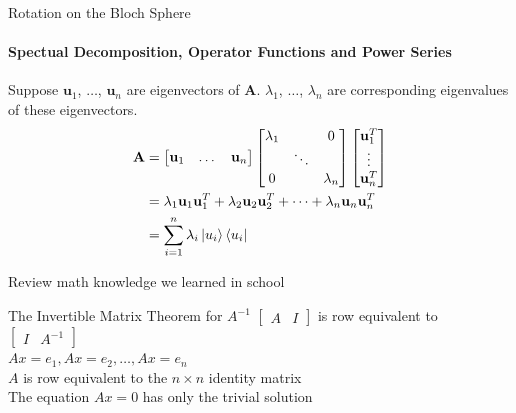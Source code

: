 \documentclass{beamer}
\begin{document}
\begin{frame}{Rotation on the Bloch Sphere}
  \framesubtitle{Spectual Decomposition, Operator Functions and Power Series}
  {\tiny
    Suppose $\mathbf{u}_1$, $\dots$, $\mathbf{u}_n$ are eigenvectors of $\mathbf{A}$.
    $\lambda_1$, $\dots$, $\lambda_n$ are corresponding eigenvalues of these eigenvectors.
    \begin{align*}
      \mathbf{A} &= \begin{bmatrix}
                      \mathbf{u}_1 & \dots & \mathbf{u}_n
                    \end{bmatrix}
                    \begin{bmatrix}
                      \lambda_1 &  & 0 \\
                      & \ddots & \\
                      0 & &  \lambda_n
                    \end{bmatrix}
                    \begin{bmatrix}
                      \mathbf{u}^{T}_1 \\
                      \vdots \\
                      \mathbf{u}^{T}_n
                    \end{bmatrix} \\
                  &=   \lambda_1\mathbf{u}_1\mathbf{u}^{T}_1
                     + \lambda_2\mathbf{u}_2\mathbf{u}^{T}_2
                     + \dots
                     + \lambda_n\mathbf{u}_n\mathbf{u}^{T}_n \\
                     &= \sum\limits_{i=1}^n \lambda_i\ket{u_i}\bra{u_i}
    \end{align*}
  }%
\end{frame}

\begin{frame}{Review math knowledge we learned in school}
  {\tiny
    \begin{block}{The Invertible Matrix Theorem for $A^{-1}$}
      $\begin{bmatrix}A&I\end{bmatrix}$ is row equivalent to $\begin{bmatrix}I&A^{-1}\end{bmatrix}$  \\
      $Ax=e_1, Ax=e_2,  \dots, Ax=e_n$ \\
      $A$ is row equivalent to the $n{\times}n$ identity matrix \\
      The equation $Ax=0$ has only the trivial solution
    \end{block}
  }%
\end{frame}
\end{document}
